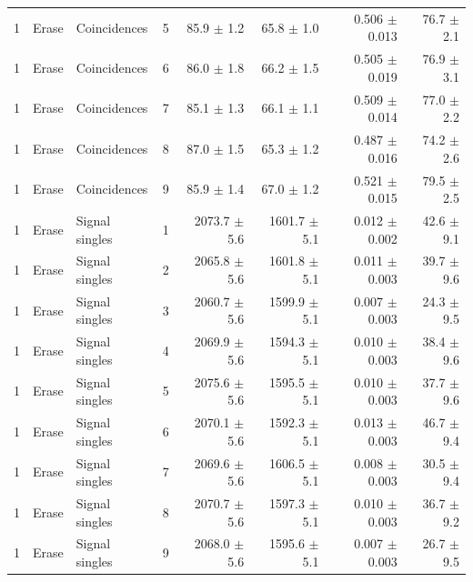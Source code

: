 \begin{tabular}{llllrrrr}
1 & Erase & Coincidences & 5 & 85.9 \ensuremath{\pm} 1.2 & 65.8 \ensuremath{\pm} 1.0 & 0.506 \ensuremath{\pm} 0.013 & 76.7 \ensuremath{\pm} 2.1 \\
1 & Erase & Coincidences & 6 & 86.0 \ensuremath{\pm} 1.8 & 66.2 \ensuremath{\pm} 1.5 & 0.505 \ensuremath{\pm} 0.019 & 76.9 \ensuremath{\pm} 3.1 \\
1 & Erase & Coincidences & 7 & 85.1 \ensuremath{\pm} 1.3 & 66.1 \ensuremath{\pm} 1.1 & 0.509 \ensuremath{\pm} 0.014 & 77.0 \ensuremath{\pm} 2.2 \\
1 & Erase & Coincidences & 8 & 87.0 \ensuremath{\pm} 1.5 & 65.3 \ensuremath{\pm} 1.2 & 0.487 \ensuremath{\pm} 0.016 & 74.2 \ensuremath{\pm} 2.6 \\
1 & Erase & Coincidences & 9 & 85.9 \ensuremath{\pm} 1.4 & 67.0 \ensuremath{\pm} 1.2 & 0.521 \ensuremath{\pm} 0.015 & 79.5 \ensuremath{\pm} 2.5 \\
\midrule
1 & Erase & Signal singles & 1 & 2073.7 \ensuremath{\pm} 5.6 & 1601.7 \ensuremath{\pm} 5.1 & 0.012 \ensuremath{\pm} 0.002 & 42.6 \ensuremath{\pm} 9.1 \\
1 & Erase & Signal singles & 2 & 2065.8 \ensuremath{\pm} 5.6 & 1601.8 \ensuremath{\pm} 5.1 & 0.011 \ensuremath{\pm} 0.003 & 39.7 \ensuremath{\pm} 9.6 \\
1 & Erase & Signal singles & 3 & 2060.7 \ensuremath{\pm} 5.6 & 1599.9 \ensuremath{\pm} 5.1 & 0.007 \ensuremath{\pm} 0.003 & 24.3 \ensuremath{\pm} 9.5 \\
1 & Erase & Signal singles & 4 & 2069.9 \ensuremath{\pm} 5.6 & 1594.3 \ensuremath{\pm} 5.1 & 0.010 \ensuremath{\pm} 0.003 & 38.4 \ensuremath{\pm} 9.6 \\
1 & Erase & Signal singles & 5 & 2075.6 \ensuremath{\pm} 5.6 & 1595.5 \ensuremath{\pm} 5.1 & 0.010 \ensuremath{\pm} 0.003 & 37.7 \ensuremath{\pm} 9.6 \\
1 & Erase & Signal singles & 6 & 2070.1 \ensuremath{\pm} 5.6 & 1592.3 \ensuremath{\pm} 5.1 & 0.013 \ensuremath{\pm} 0.003 & 46.7 \ensuremath{\pm} 9.4 \\
1 & Erase & Signal singles & 7 & 2069.6 \ensuremath{\pm} 5.6 & 1606.5 \ensuremath{\pm} 5.1 & 0.008 \ensuremath{\pm} 0.003 & 30.5 \ensuremath{\pm} 9.4 \\
1 & Erase & Signal singles & 8 & 2070.7 \ensuremath{\pm} 5.6 & 1597.3 \ensuremath{\pm} 5.1 & 0.010 \ensuremath{\pm} 0.003 & 36.7 \ensuremath{\pm} 9.2 \\
1 & Erase & Signal singles & 9 & 2068.0 \ensuremath{\pm} 5.6 & 1595.6 \ensuremath{\pm} 5.1 & 0.007 \ensuremath{\pm} 0.003 & 26.7 \ensuremath{\pm} 9.5 \\
\bottomrule
\end{tabular}
